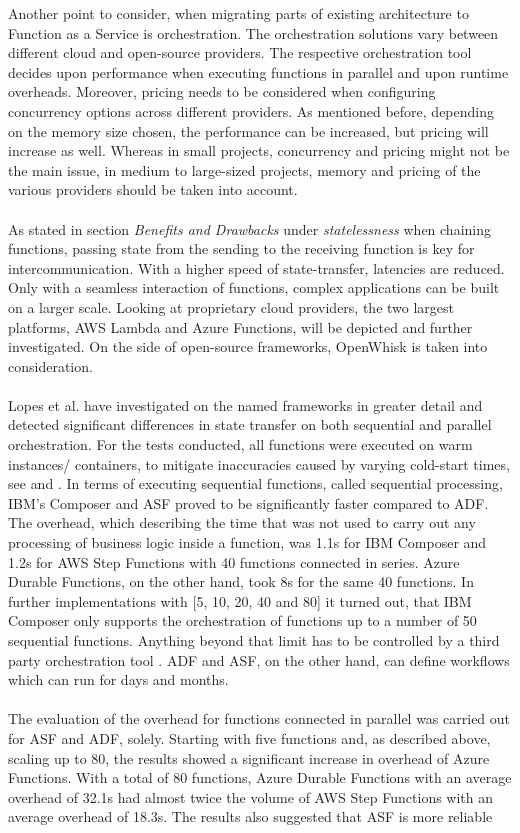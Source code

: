\documentclass[a4paper,twoside,11pt, pagesize]{scrartcl}
\begin{document}
\begin{spacing}{1.2}
 Another point to consider, when migrating parts of existing architecture to Function as a Service is orchestration. The orchestration solutions vary between different cloud and open-source providers. The respective orchestration tool decides upon performance when executing functions in parallel and upon runtime overheads. Moreover, pricing needs to be considered when configuring concurrency options across different providers. As mentioned before, depending on the memory size chosen, the performance can be increased, but pricing will increase as well. Whereas in small projects, concurrency and pricing might not be the main issue, in medium to large-sized projects, memory and pricing of the various providers should be taken into account.\\\\ As stated in section \textit{Benefits and Drawbacks} under \textit{statelessness} when chaining functions, passing state from the sending to the receiving function is key for intercommunication. With a higher speed of state-transfer, latencies are reduced. Only with a seamless interaction of functions, complex applications can be built on a larger scale. Looking at proprietary cloud providers, the two largest platforms, AWS Lambda and Azure Functions,  will be depicted and further investigated. On the side of open-source frameworks, OpenWhisk is taken into consideration.\\\\ Lopes et al. have investigated on the named frameworks in greater detail and detected significant differences in state transfer on both sequential and parallel orchestration. For the tests conducted, all functions were executed on warm instances/ containers, to mitigate inaccuracies caused by varying cold-start times, see \cite{manner2018cold} and \cite{jackson2018investigation}. In terms of executing sequential functions, called sequential processing, IBM's Composer and ASF proved to be significantly faster compared to ADF. The overhead, which describing the time that was not used to carry out any processing of business logic inside a function, was 1.1s for IBM Composer and 1.2s for AWS Step Functions with 40 functions connected in series. Azure Durable Functions, on the other hand, took 8s for the same 40 functions. In further implementations with [5, 10, 20, 40 and 80] it turned out, that IBM Composer only supports the orchestration of functions up to a number of 50 sequential functions. Anything beyond that limit has to be controlled by a third party orchestration tool \cite{lopez2018comparison}. ADF and ASF, on the other hand, can define workflows which can run for days and months.\\\\ The evaluation of the overhead for functions connected in parallel was carried out for ASF and ADF, solely. Starting with five functions and, as described above, scaling up to 80, the results showed a significant increase in overhead of Azure Functions. With a total of 80 functions, Azure Durable Functions with an average overhead of 32.1s had almost twice the volume of AWS Step Functions with an average overhead of 18.3s. The results also suggested that ASF is more reliable 
\end{spacing}
\end{document}
